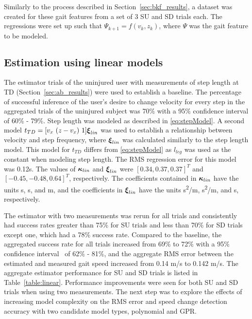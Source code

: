 Similarly to the process described in Section~\ref{sec:bkf_results}, a dataset was created for these gait features from a set of 3 SU and SD trials each. The regressions were set up such that $ \Psi_{k+1} = f(v_k,z_k) $, where $ \Psi $ was the gait feature to be modeled.

\subsection{Estimation using linear models}\label{sec:linear}

The estimator trials of the uninjured user with measurements of step length at TD (Section~\ref{sec:ab_results}) were used to establish a baseline. The percentage of successful inference of the user's desire to change velocity for every step in the aggregated trials of the uninjured subject was 70\% with a 95\% confidence interval of 60\% - 79\%. Step length was modeled as described in \eqref{eq:stepModel}. A second model $t_{TD} =  [v_x\ (z - v_x)\ 1] \boldsymbol{\xi}_{lin}$ was used to establish a relationship between velocity and step frequency, where $ \boldsymbol{\xi}_{lin} $ was calculated similarly to the step length model. This model for $ t_{TD} $ differs from \eqref{eq:stepModel} as $ l_{leg} $ was used as the constant when modeling step length. The RMS regression error for this model was 0.12s. The values of $ \boldsymbol{\kappa}_{lin} $ and $ \boldsymbol{\xi}_{lin} $ were $[0.34 ,0.37 ,0.37]^T$ and $ [-0.45 ,-0.48 ,0.64]^T $, respectively. The coefficients contained in $ \boldsymbol{\kappa}_{lin} $ have the units s, s, and m, and the coefficients in $ \boldsymbol{\xi}_{lin} $ have the units s\textsuperscript{2}/m, s\textsuperscript{2}/m, and s, respectively.

The estimator with two measurements was rerun for all trials and consistently had success rates greater than 75\% for SU trials and less than 70\% for SD trials except one, which had a 78\% success rate. Compared to the baseline, the aggregated success rate for all trials increased from 69\% to  72\% with a 95\% confidence interval~\cite{brown2001interval} of 62\% - 81\%, and the aggregate RMS error between the estimated and measured gait speed increased from 0.14 m/s to 0.142 m/s. The aggregate estimator performance for SU and SD trials is listed in Table~\ref{table:linear}. Performance improvements were seen for both SU and SD trials when using two measurements. The next step was to explore the effects of increasing model complexity on the RMS error and speed change detection accuracy with two candidate model types, polynomial and GPR.

